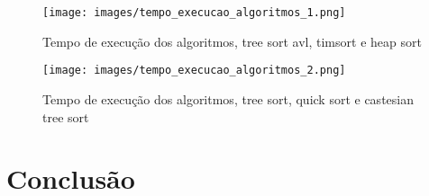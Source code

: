 \documentclass[12pt]{article}
\begin{document}
\begin{figure}[H]
\centering
\texttt{[image: images/tempo\_execucao\_algoritmos\_1.png]}
\caption{Tempo de execução dos algoritmos, tree sort avl, timsort e heap sort}
\label{fig:tempo_execução_algoritmos_1}
\end{figure}

\begin{figure}[ht]
\centering
\texttt{[image: images/tempo\_execucao\_algoritmos\_2.png]}
\caption{Tempo de execução dos algoritmos, tree sort, quick sort e castesian tree sort}
\label{fig:tempo_execução_algoritmos_2}
\end{figure}


\section{Conclusão}
\label{sec:conclusao}



\end{document}
